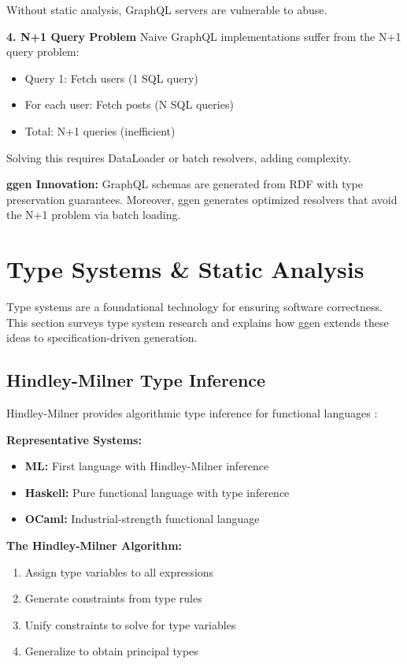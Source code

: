 Without static analysis, GraphQL servers are vulnerable to abuse.

\textbf{4. N+1 Query Problem}
Naive GraphQL implementations suffer from the N+1 query problem:
\begin{itemize}
    \item Query 1: Fetch users (1 SQL query)
    \item For each user: Fetch posts (N SQL queries)
    \item Total: N+1 queries (inefficient)
\end{itemize}

Solving this requires DataLoader or batch resolvers, adding complexity.

\textbf{ggen Innovation:} GraphQL schemas are generated from RDF with type preservation guarantees. Moreover, ggen generates optimized resolvers that avoid the N+1 problem via batch loading.

\section{Type Systems \& Static Analysis}

Type systems are a foundational technology for ensuring software correctness. This section surveys type system research and explains how ggen extends these ideas to specification-driven generation.

\subsection{Hindley-Milner Type Inference}

Hindley-Milner provides algorithmic type inference for functional languages \cite{hindley1969, milner1978}:

\textbf{Representative Systems:}
\begin{itemize}
    \item \textbf{ML:} First language with Hindley-Milner inference
    \item \textbf{Haskell:} Pure functional language with type inference
    \item \textbf{OCaml:} Industrial-strength functional language
\end{itemize}

\textbf{The Hindley-Milner Algorithm:}
\begin{enumerate}
    \item Assign type variables to all expressions
    \item Generate constraints from type rules
    \item Unify constraints to solve for type variables
    \item Generalize to obtain principal types
\end{enumerate}

